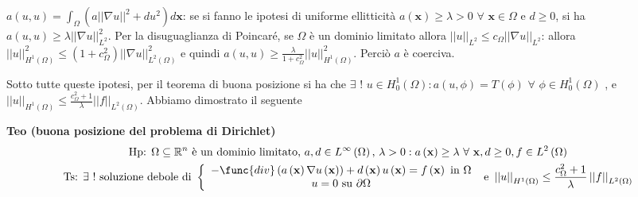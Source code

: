 \documentclass{article}
\begin{document}
$a\left( u,u\right) =\int_{\Omega }\left( a\left\vert \left\vert \nabla
u\right\vert \right\vert ^{2}+du^{2}\right) d\mathbf{x}$: se si fanno le
ipotesi di uniforme ellitticit\`{a} $a\left( \mathbf{x}\right) \geq \lambda
>0$ $\forall $ $\mathbf{x}\in \Omega $ e $d\geq 0$, si ha $a\left(
u,u\right) \geq \lambda \left\vert \left\vert \nabla u\right\vert
\right\vert _{L^{2}}^{2}$. Per la disuguaglianza di Poincar\'{e}, se $\Omega 
$ \`{e} un dominio limitato allora $\left\vert \left\vert u\right\vert
\right\vert _{L^{2}}\leq c_{\Omega }\left\vert \left\vert \nabla
u\right\vert \right\vert _{L^{2}}$: allora $\left\vert \left\vert
u\right\vert \right\vert _{H^{1}\left( \Omega \right) }^{2}\leq \left(
1+c_{\Omega }^{2}\right) \left\vert \left\vert \nabla u\right\vert
\right\vert _{L^{2}\left( \Omega \right) }^{2}$ e quindi $a\left( u,u\right)
\geq \frac{\lambda }{1+c_{\Omega }^{2}}\left\vert \left\vert u\right\vert
\right\vert _{H^{1}\left( \Omega \right) }^{2}$. Perci\`{o} $a$ \`{e}
coerciva.

Sotto tutte queste ipotesi, per il teorema di buona posizione si ha che $%
\exists $ $!$ $u\in H_{0}^{1}\left( \Omega \right) :a\left( u,\phi \right)
=T\left( \phi \right) $ $\forall $ $\phi \in H_{0}^{1}\left( \Omega \right) $%
, e $\left\vert \left\vert u\right\vert \right\vert _{H^{1}\left( \Omega
\right) }\leq \frac{c_{\Omega }^{2}+1}{\lambda }\left\vert \left\vert
f\right\vert \right\vert _{L^{2}\left( \Omega \right) }$. Abbiamo dimostrato
il seguente

\textbf{Teo (buona posizione del problema di Dirichlet)}%
\begin{gather*}
\text{Hp: }\Omega \subseteq 
\mathbb{R}
^{n}\text{ \`{e} un dominio limitato, }a,d\in L^{\infty }\left( \Omega
\right) \text{, }\lambda >0:a\left( \mathbf{x}\right) \geq \lambda \text{ }%
\forall \text{ }\mathbf{x},d\geq 0,f\in L^{2}\left( \Omega \right) \\
\text{Ts: }\exists \text{ }!\text{ soluzione debole di }\left\{ 
\begin{array}{c}
-\func{div}\left( a\left( \mathbf{x}\right) \nabla u\left( \mathbf{x}\right)
\right) +d\left( \mathbf{x}\right) u\left( \mathbf{x}\right) =f\left( 
\mathbf{x}\right) \text{ in }\Omega \\ 
u=0\text{ su }\partial \Omega%
\end{array}%
\right. \text{ e }\left\vert \left\vert u\right\vert \right\vert
_{H^{1}\left( \Omega \right) }\leq \frac{c_{\Omega }^{2}+1}{\lambda }%
\left\vert \left\vert f\right\vert \right\vert _{L^{2}\left( \Omega \right) }
\end{gather*}
\end{document}
